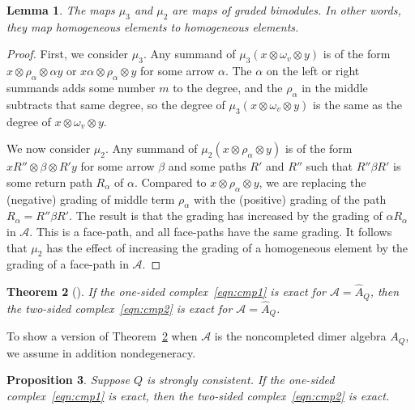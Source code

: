 \documentclass{article}
\newtheorem{thm}{Theorem}[section]
\newtheorem{prop}[thm]{Proposition}
\newtheorem{lemma}[thm]{Lemma}
\theoremstyle{definition}
\newcommand{\A}{{\mathcal A}}
\begin{document}
\begin{lemma}\label{lem:gradres}
	The maps $\mu_3$ and $\mu_2$ are maps of graded bimodules. In other words, they map homogeneous elements to homogeneous elements. 
\end{lemma}
\begin{proof}
	First, we consider $\mu_3$. Any summand of $\mu_3(x\otimes\omega_v\otimes y)$ is of the form $x\otimes\rho_\alpha\otimes\alpha y$ or $x\alpha\otimes\rho_\alpha\otimes y$ for some arrow $\alpha$. The $\alpha$ on the left or right summands adds some number $m$ to the degree, and the $\rho_\alpha$ in the middle subtracts that same degree, so the degree of $\mu_3(x\otimes\omega_v\otimes y)$ is the same as the degree of $x\otimes\omega_v\otimes y$. 

	We now consider $\mu_2$. Any summand of $\mu_2(x\otimes\rho_\alpha\otimes y)$ is of the form $xR''\otimes\beta\otimes R'y$ for some arrow $\beta$ and some paths $R'$ and $R''$ such that $R''\beta R'$ is some return path $R_\alpha$ of $\alpha$. Compared to $x\otimes\rho_\alpha\otimes y$, we are replacing the (negative) grading of middle term $\rho_\alpha$ with the (positive) grading of the path $R_\alpha=R''\beta R'$. The result is that the grading has increased by the grading of $\alpha R_\alpha$ in $\A$. This is a face-path, and all face-paths have the same grading. It follows that $\mu_2$ has the effect of increasing the grading of a homogeneous element by the grading of a face-path in $\A$.
\end{proof}
\begin{thm}[{\cite[Lemma 4.7]{XPressland2017}}]\label{thm:wherebefore}
	If the one-sided complex~\eqref{eqn:cmp1} is exact for $\A=\widehat A_Q$, then the two-sided complex~\eqref{eqn:cmp2} is exact for $\A=\widehat A_Q$.
\end{thm}
To show a version of Theorem~\ref{thm:wherebefore} when $\A$ is the noncompleted dimer algebra $A_Q$, we assume in addition nondegeneracy.
\begin{prop}\label{prop:1iff2}
	Suppose $Q$ is strongly consistent. If the one-sided complex~\eqref{eqn:cmp1} is exact, then the two-sided complex~\eqref{eqn:cmp2} is exact.
\end{prop}
\end{document}
